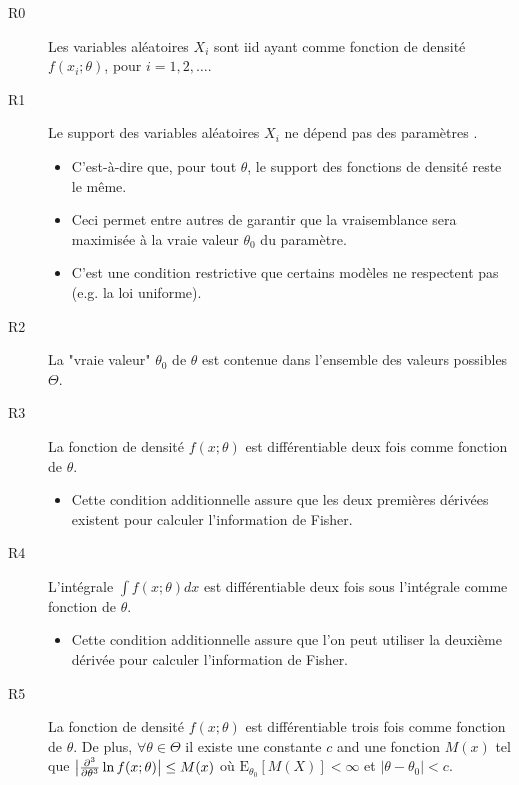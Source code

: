 \documentclass[french]{article}
\begin{document}
\begin{multicols*}{2}
\begin{definitionNOHFILLprop}
\begin{description}
	\item[R0]	Les variables aléatoires $X_{i}$ sont iid ayant comme fonction de densité $f(x_{i}; \theta)$, pour $i	=	1, 2, \dots$.
	\item[R1]	Le support des variables aléatoires $X_{i}$ ne dépend pas des paramètres .
		\begin{itemize}
		\item	C'est-à-dire que, pour tout $\theta$, le support des fonctions de densité reste le même.
		\item	Ceci permet entre autres de garantir que la vraisemblance sera maximisée à la vraie valeur $\theta_{0}$ du paramètre.
		\item	C'est une condition restrictive que certains modèles ne respectent pas (e.g. la loi uniforme).
		\end{itemize}
	\item[R2]	La "vraie valeur" $\theta_{0}$ de $\theta$ est contenue dans l'ensemble des valeurs possibles $\Theta$.
\end{description}
\tcbline
\begin{description}
	\item[R3]	La fonction de densité $f(x; \theta)$ est différentiable deux fois comme fonction de $\theta$.
		\begin{itemize}
		\item	Cette condition additionnelle assure que les deux premières dérivées existent pour calculer l'information de Fisher.
		\end{itemize}
	\item[R4]	L'intégrale $\int f(x; \theta) dx$ est différentiable deux fois sous l'intégrale comme fonction de $\theta$.
		\begin{itemize}
		\item	Cette condition additionnelle assure que l'on peut utiliser la deuxième dérivée pour calculer l'information de Fisher.
		\end{itemize}
\end{description}
\tcbline
\begin{description}
	\item[R5]	La fonction de densité $f(x; \theta)$ est différentiable trois fois comme fonction de $\theta$. De plus, $\forall \theta \in \Theta$ il existe une constante $c$ and une fonction $M(x)$ tel que $\big| \deriv[3]{\theta}{} \ln f(x; \theta) \big| \leq M(x)$ où $\text{E}_{\theta_{0}}[M(X)] < \infty$ et $|\theta - \theta_{0}| < c$.

\end{description}
\end{definitionNOHFILLprop}
\end{multicols*}
\end{document}
